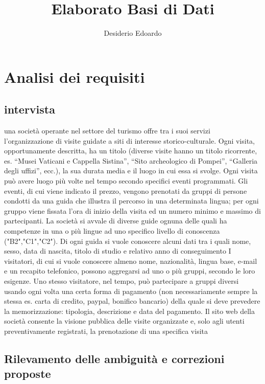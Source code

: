 \documentclass[a4paper,12pt]{report}
\title{Elaborato Basi di Dati}
\author{Desiderio Edoardo}
\begin{document}
\maketitle
\titlepage
\tableofcontents
\newpage

\chapter{Analisi dei requisiti}

\section{intervista}
una	 società	 operante	 nel	 settore	 del	 turismo	 offre	 tra	 i	 suoi	 servizi	 l’organizzazione	 di	 	 visite	
guidate	a	siti	di	interesse	storico-culturale.
Ogni	visita,	opportunamente	descritta,	ha	un	 titolo	 (diverse	visite	hanno	un	 titolo	 ricorrente,	es.	
“Musei	Vaticani	e	Cappella	Sistina”,	“Sito	archeologico	di	Pompei”,	“Galleria	degli	uffizi”,	ecc.),	la	
sua	durata	media		e	il	luogo		in	cui	essa	si	svolge.	Ogni	visita	può	avere	luogo	più	volte	nel	tempo	
secondo	specifici	eventi	programmati.
Gli	eventi,	di	cui	viene	indicato	il	prezzo,	vengono	prenotati	da	gruppi	di	persone	condotti	da	una	
guida	che	illustra	il	percorso	in	una	determinata	lingua;	per	ogni	gruppo	viene	fissata	l’ora	di	inizio	
della	visita	ed	un	numero	minimo	e	massimo	di	partecipanti.
La	società	si	avvale	di	diverse	guide	ognuna	delle	quali	ha	competenze	in	una	o	più	lingue	ad	uno	
specifico	 livello	 di	 conoscenza	 ("B2","C1","C2").	 	 Di	 ogni	 guida	 si	 vuole	
conoscere	 alcuni	 dati	 tra	 i	 quali	 nome,	 sesso,	 data	 di	 nascita,	 titolo	 di	 studio	 e	 relativo	 anno	 di	
conseguimento
I	visitatori,	di	cui	si	vuole	conoscere	almeno	nome,	nazionalità,	lingua	base,	e-mail	e	un	 recapito	
telefonico,	 possono	 aggregarsi	 ad	 uno	 o	 più	 gruppi,	 secondo	 le	 loro	 esigenze.	 Uno	 stesso	
visitatore,	 nel	 tempo,	 può	 partecipare	 a	 gruppi	 diversi	 usando	 ogni	 volta	 una	 certa	 forma	 di	
pagamento	(non	necessariamente	sempre	la	stessa	es.	carta	di	credito,	paypal,	bonifico	bancario)	
della	quale	si	deve	prevedere	la	memorizzazione:	tipologia,	descrizione	e	data	del	pagamento.
Il	 sito	 web	 della	 società	 consente	 la	 visione	 pubblica	 delle	 visite	 organizzate	 e,	 solo	 agli	 utenti	
preventivamente	registrati,	la	prenotazione	di	una	specifica	visita

\section{Rilevamento delle ambiguità e correzioni proposte}
\end{document}
